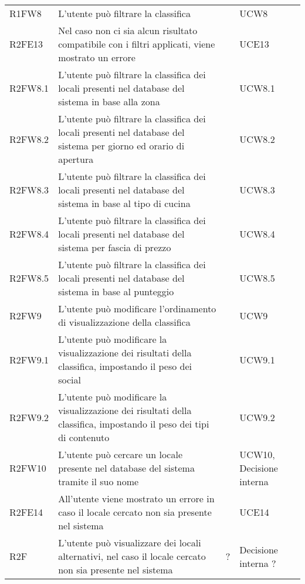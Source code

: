 \begin{longtable}{ m{}<{\centering}  m{}<{\centering}  m{}<{\centering}  m{}<{\centering}}
	R1FW8 & L’utente può filtrare la classifica & \Ob & UCW8\\		
	
	R2FE13 & Nel caso non ci sia alcun risultato compatibile con i filtri applicati, viene mostrato un errore & \De & UCE13\\	
	 
	R2FW8.1 & L’utente può filtrare la classifica dei locali presenti nel database del sistema in base alla zona & \De & UCW8.1\\	
	 
	R2FW8.2 & L’utente può filtrare la classifica dei locali presenti nel database del sistema per giorno ed orario di apertura & \De & UCW8.2\\	
	 
	R2FW8.3 & L’utente può filtrare la classifica dei locali presenti nel database del sistema in base al tipo di cucina & \De & UCW8.3\\	
	 
	R2FW8.4 & L’utente può filtrare la classifica dei locali presenti nel database del sistema per fascia di prezzo & \De & UCW8.4\\	 
	 
	R2FW8.5 & L’utente può filtrare la classifica dei locali presenti nel database del sistema in base al punteggio & \De & UCW8.5\\	 
	 
	R2FW9 & L’utente può modificare l’ordinamento di visualizzazione della classifica & \De & UCW9\\	
	 
	R2FW9.1 & L’utente può modificare la visualizzazione dei risultati della classifica, impostando il peso dei social & \De & UCW9.1\\	 
	 
	R2FW9.2 & L’utente può modificare la visualizzazione dei risultati della classifica, impostando il peso dei tipi di contenuto & \De & UCW9.2\\	  
	 
	R2FW10 & L’utente può cercare un locale presente nel database del sistema tramite il suo nome & \Ob & UCW10, Decisione interna\\	 
	 
	R2FE14 & All’utente viene mostrato un errore in caso il locale cercato non sia presente nel sistema & \De & UCE14\\	 
	 
	R2F & L’utente può visualizzare dei locali alternativi, nel caso il locale cercato non sia presente nel sistema & \De ? & Decisione interna ?\\	 
	 

\end{longtable}
